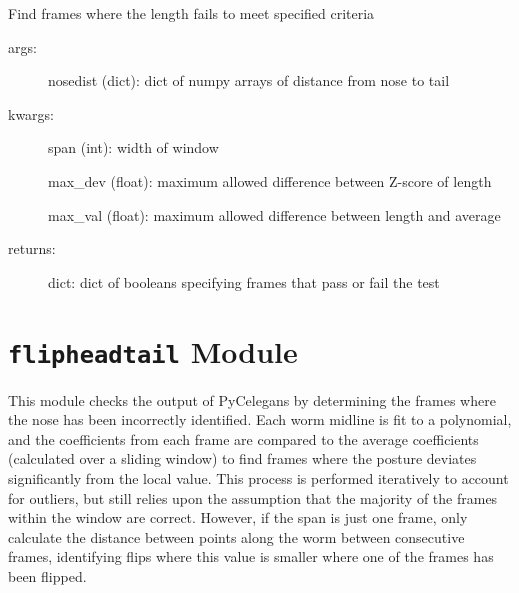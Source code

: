 \documentclass[letterpaper,10pt,openany,oneside]{sphinxmanual}
\begin{document}
\begin{fulllineitems}
\label{index:checklength.main}
Find frames where the length fails to meet specified criteria
\begin{description}
\item[{args:}] \leavevmode
nosedist (dict): dict of numpy arrays of distance from nose to tail

\item[{kwargs:}] \leavevmode
span (int): width of window

max\_dev (float): maximum allowed difference between Z-score of length

max\_val (float): maximum allowed difference between length and average

\item[{returns:}] \leavevmode
dict: dict of booleans specifying frames that pass or fail the test

\end{description}

\end{fulllineitems}



\chapter{\texttt{flipheadtail} Module}
\label{index:module-flipheadtail}\label{index:flipheadtail-module}
This module checks the output of PyCelegans by determining the frames where the nose has been incorrectly identified. Each worm midline is fit to a 
polynomial, and the coefficients from each frame are compared to the
average coefficients (calculated over a sliding window) to find frames
where the posture deviates significantly from the local value. This process 
is performed iteratively to account for outliers, but still relies upon the 
assumption that the majority of the frames within the window are correct. However, if the span is just one frame, only calculate the distance between points along the worm between consecutive frames, identifying flips where this value is smaller where one of the frames has been flipped.
\end{document}
